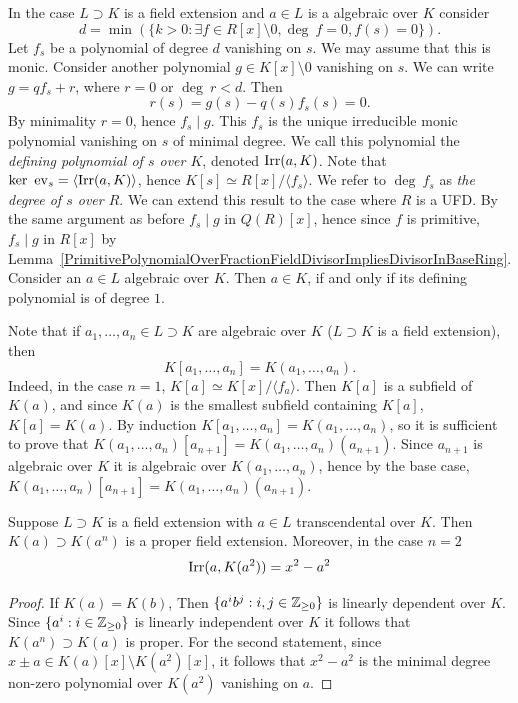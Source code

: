 \begin{remark}\label{MinimalPolynomialDefinitionAndTechnicalRemarks}
    In the case $L\supset K$ is a field extension and $a\in L$ is a algebraic over $K$ consider 
    $$
        d = \min (\{ k>0 : \exists f\in R[x]\setminus 0, \deg \ f = 0, f(s) =0\}).
    $$ 
    Let $f_s$ be a polynomial of degree $d$ vanishing on $s$. We may assume that this is monic. Consider another polynomial $g\in K[x]\setminus 0$ vanishing on $s$. We can write $g = qf_s+r$, where $r = 0$ or $\deg \ r < d$. Then 
    $$r(s) =g(s)- q(s)f_s(s)=0.$$
    By minimality $r = 0$, hence $f_s\mid g$. This $f_s$ is the unique irreducible monic polynomial vanishing on $s$ of minimal degree. We call this polynomial the \textit{defining polynomial of $s$ over $K$}, denoted $\mathrm{Irr}(a,K)$. Note that $\ker \ \mathrm{ev}_s = \langle \mathrm{Irr}(a,K)\rangle$, hence $K[s]\simeq R[x]/\langle f_s\rangle$.
    We refer to $\deg \ f_s$ as \textit{the degree of $s$ over $R$}. We can extend this result to the case where $R$ is a UFD. By the same argument as before $f_s\mid g$ in $Q(R)[x]$, hence since $f$ is primitive, $f_s\mid g$ in $R[x]$ by Lemma~\ref{PrimitivePolynomialOverFractionFieldDivisorImpliesDivisorInBaseRing}.\\
    Consider an $a\in L$  algebraic over $K$. Then $a\in K$, if and only if its defining polynomial is of degree $1$. 
\end{remark}
\begin{remark}
    Note that if $a_1,\dots,a_n\in L\supset K$ are algebraic over $K$ ($L\supset K$ is a field extension), then 
    $$K[a_1,\dots,a_n] = K(a_1,\dots,a_n).$$
    Indeed, in the case $n=1$, $K[a]\simeq K[x]/\langle f_a\rangle$. Then $K[a]$ is a subfield of $K(a)$, and since $K(a)$ is the smallest subfield containing $K[a]$, $K[a]=K(a)$. By induction $K[a_1,\dots,a_n]=K(a_1,\dots,a_n)$, so it is sufficient to prove that $K(a_1,\dots,a_n)[a_{n+1}]=K(a_1,\dots,a_n)(a_{n+1})$. Since $a_{n+1}$ is algebraic over $K$ it is algebraic over $K(a_1,\dots,a_n)$, hence by the base case, $K(a_1,\dots,a_n)[a_{n+1}]=K(a_1,\dots,a_n)(a_{n+1})$.
\end{remark}
\begin{corollary}
    Suppose $L\supset K$ is a field extension with $a\in L$ transcendental over $K$. Then $K(a) \supset K(a^n)$ is a proper field extension. Moreover, in the case $n=2$
    $$
        \mathrm{Irr}(a,K(a^2)) = x^2 - a^2
    $$
\end{corollary}
\begin{proof}
    If $K(a)=K(b)$, Then $\{a^ib^j : i,j\in \mathbb{Z}_{\geq0}\}$ is linearly dependent over $K$. Since $\{a^i : i\in \mathbb{Z}_{\geq 0}\}$ is linearly independent over $K$ it follows that $K(a^n) \supset K(a)$ is proper. For the second statement, since $x\pm a\in K(a)[x]\setminus K(a^2)[x]$, it follows that $x^2-a^2$ is the minimal degree  non-zero polynomial over $K(a^2)$ vanishing on $a$. 
\end{proof}

